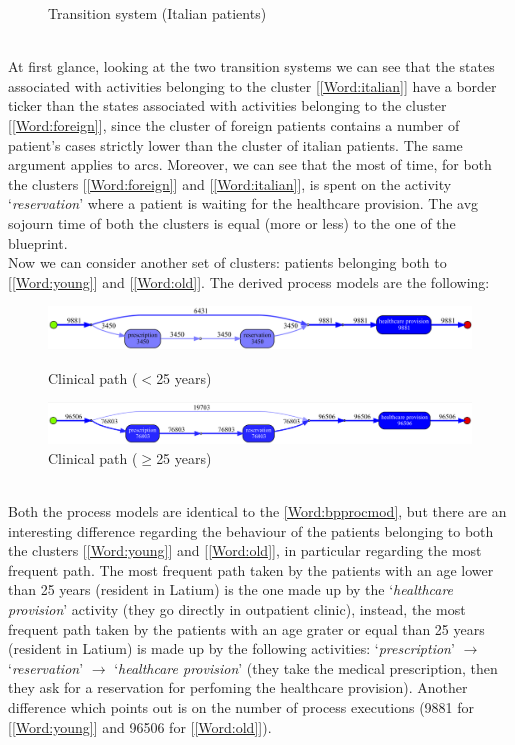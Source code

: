 \begin{figure} [htbp]
\begin{minipage}[t]{0.5\textwidth}
\caption{Transition system (Italian patients)}
\end{minipage}
\end{figure}\\
At first glance, looking at the two transition systems we can see that the states associated with activities belonging to the cluster [\ref{Word:italian}] have a border ticker than the states associated with activities belonging to the cluster [\ref{Word:foreign}], since the cluster of foreign patients contains a number of
patient's cases strictly lower than the cluster of italian patients. The same argument applies to arcs. Moreover, we can see that the most of time, for both the clusters [\ref{Word:foreign}] and [\ref{Word:italian}], is spent on the activity `\textit{reservation}' where a patient is waiting for the healthcare provision. %
The avg sojourn time of both the clusters is equal (more or less) to the one of the blueprint.\\
Now we can consider another set of clusters: patients belonging both to [\ref{Word:young}] and [\ref{Word:old}]. The derived process models are the following:
\begin{figure} [htbp]
\includegraphics[width=\textwidth]{AmbulatoriInductiveVisualMinerYoungs}
\caption{Clinical path ($<$25 years)}
\includegraphics[width=\textwidth]{AmbulatoriInductiveVisualMinerOlds}
\caption{Clinical path ($\geq$25 years)}
\end{figure}\\
Both the process models are identical to the \ref{Word:bpprocmod}, but there are an interesting difference regarding the behaviour of the patients belonging to both the clusters [\ref{Word:young}] and [\ref{Word:old}], in particular regarding the most frequent path. The most frequent path taken by the patients with an age lower than 25 years (resident in Latium) is the one made up by the `\textit{healthcare provision}' activity (they go directly in outpatient clinic), instead, the most frequent path taken by the patients with an age grater or equal than 25 years (resident in Latium) is made up by the following activities: `\textit{prescription}' $ \rightarrow $ `\textit{reservation}' $ \rightarrow$ `\textit{healthcare provision}' (they take the medical prescription, then they ask for a reservation for perfoming the healthcare provision). Another difference which points out is on the number of process executions (9881 for [\ref{Word:young}] and 96506 for [\ref{Word:old}]).\\
